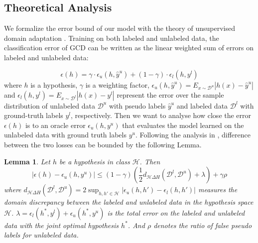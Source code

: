 \documentclass[letterpaper]{article} %
\newtheorem{lemma}{Lemma}
\begin{document}
\subsection{Theoretical Analysis}
We formalize the error bound of our model with the theory of unsupervised domain adaptation \citep{proto3,theory}. Training on both labeled and unlabeled data, the classification error of GCD can be written as the linear weighted sum of errors on labeled and unlabeled data:

\begin{equation}
\epsilon(h)=\gamma \cdot \epsilon_{u}(h,\hat y^u) + (1-\gamma) \cdot \epsilon_{l}(h,y^l)
\label{ErrorTPN}
\end{equation}
where $h$ is a hypothesis, $\gamma$ is a weighting factor, $\epsilon_{u}(h,\hat y^u)=E_{x\sim \mathcal{D}^u}|h(x)-\hat y^u|$ and $\epsilon_{l}(h,y^l)=E_{x\sim \mathcal{D}^l}|h(x)-y^l|$ represent the error over the sample distribution of unlabeled data $\mathcal{D}^u$ with pseudo labels $\hat y^u$ and labeled data $\mathcal{D}^l$ with ground-truth labels $y^l$, respectively.
Then we want to analyse how close the error $\epsilon(h)$ is to an oracle error $\epsilon_{u}(h,y^{u})$ that evaluates the model learned on the unlabeled data with ground truth labels $y^{u}$. Following the analysis in \citet{proto3}, difference between the two losses can be bounded by the following Lemma.


\begin{lemma}
Let $h$ be a hypothesis in class $\mathcal{H}$. Then
\begin{equation}
\left|\epsilon(h)-\epsilon_{u}(h,y^u)\right| \le(1-\gamma) (\frac{1}{2}d_{\mathcal{H}\Delta{H}}(\mathcal{D}^l,\mathcal{D}^u)+\lambda)+\gamma\rho
\end{equation}
where $d_{\mathcal{H}\Delta{H}}(\mathcal{D}^l,\mathcal{D}^u)= 2 \sup_{h,h' \in\mathcal{H}} |\epsilon_u(h,h')-\epsilon_l(h,h')|$ measures the domain discrepancy between the labeled and unlabeled data in the hypothesis space $\mathcal{H}$. $\lambda=\epsilon_l(h^*,y^l)+\epsilon_{u}(h^*,y^{u})$ is the total error on the labeled and unlabeled data with the joint optimal hypothesis $h^*$. And $\rho$ denotes the ratio of false pseudo labels for unlabeled data.
\end{lemma}
\end{document}
